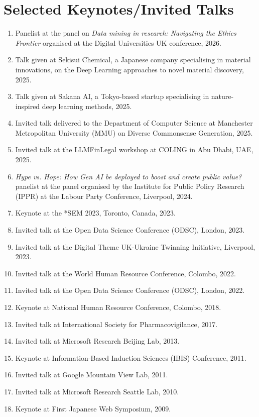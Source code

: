 \documentclass[a4paper,11pt]{article}
\begin{document}
\section{Selected Keynotes/Invited Talks}
\begin{enumerate}
\item Panelist at the panel on \emph{Data mining in research: Navigating the Ethics Frontier} organised at the Digital Universities UK conference, 2026.
\item Talk given at Sekisui Chemical, a Japanese company specialising in material innovations, on the Deep Learning approaches to novel material discovery, 2025.
\item Talk given at Sakana AI, a Tokyo-based startup specialising in nature-inspired deep learning methods, 2025.
\item Invited talk delivered to the Department of Computer Science at Manchester Metropolitan University (MMU) on Diverse Commonsense Generation, 2025.
\item Invited talk at the LLMFinLegal workshop at COLING in Abu Dhabi, UAE, 2025.
\item \emph{Hype vs. Hope: How Gen AI be deployed to boost and create public value?} panelist at the panel organised by the Institute for Public Policy Research (IPPR) at the Labour Party Conference, Liverpool, 2024.
\item Keynote at the *SEM 2023, Toronto, Canada, 2023.
\item Invited talk at the Open Data Science Conference (ODSC), London, 2023.
\item Invited talk at the Digital Theme UK-Ukraine Twinning Initiative, Liverpool, 2023.
\item Invited talk at the World Human Resource Conference, Colombo, 2022.
\item Invited talk at the Open Data Science Conference (ODSC), London, 2022.
\item Keynote at National Human Resource Conference, Colombo, 2018.
\item Invited talk at International Society for Pharmacovigilance, 2017.
\item Invited talk at Microsoft Research Beijing Lab, 2013.
\item Keynote at Information-Based Induction Sciences (IBIS) Conference, 2011.
\item Invited talk at Google Mountain View Lab, 2011.
\item Invited talk at Microsoft Research Seattle Lab, 2010.
\item Keynote at First Japanese Web Symposium, 2009.
\end{enumerate}
\end{document}
